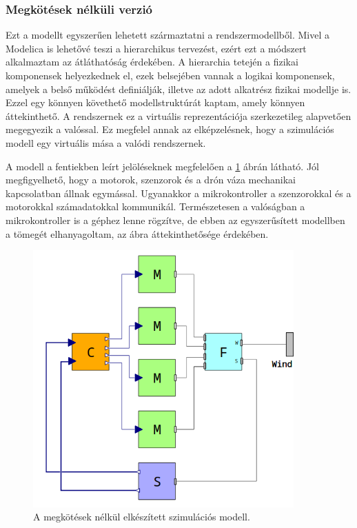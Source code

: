         \subsubsection{Megkötések nélküli verzió}
        Ezt a modellt egyszerűen lehetett származtatni a rendszermodellből. Mivel a Modelica is lehetővé teszi a hierarchikus tervezést, ezért ezt a módszert alkalmaztam az átláthatóság érdekében.
        A hierarchia tetején a fizikai komponensek helyezkednek el, ezek belsejében vannak a logikai komponensek, amelyek a belső működést definiálják, illetve az adott alkatrész fizikai modellje is.
        Ezzel egy könnyen követhető modellstruktúrát kaptam, amely könnyen áttekinthető. A rendszernek ez a virtuális reprezentációja szerkezetileg alapvetően megegyezik a valóssal.
        Ez megfelel annak az elképzelésnek, hogy a szimulációs modell egy virtuális mása a valódi rendszernek.

        A modell a fentiekben leírt jelöléseknek megfelelően a \ref{fig:stdSzim} ábrán látható.
        Jól megfigyelhető, hogy a motorok, szenzorok és a drón váza mechanikai kapcsolatban állnak egymással.
        Ugyanakkor a mikrokontroller a szenzorokkal és a motorokkal számadatokkal kommunikál.
        Természetesen a valóságban a mikrokontroller is a géphez lenne rögzítve, de ebben az egyszerűsített modellben a tömegét elhanyagoltam, az ábra áttekinthetősége érdekében.

        \begin{figure}[!ht]
            \centering
            \includegraphics[width=100mm, keepaspectratio]{figures/stdSzim.png}
            \caption{A megkötések nélkül elkészített szimulációs modell.} 
            \label{fig:stdSzim}
        \end{figure}

